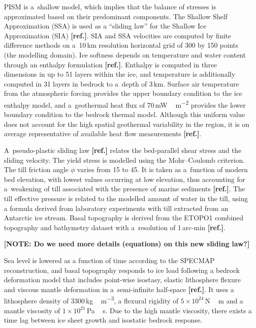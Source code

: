 \documentclass[tc, ms]{copernicus}
\newcommand{\note}[1]{\textbf{[NOTE: #1]}}
\newcommand{\aref}[0]{\textbf{[ref.]}}
\renewcommand{\citep}[1]{\aref}
\begin{document}
PISM is a~shallow model, which implies that the balance of stresses is
approximated based on their predominant components.
The Shallow Shelf Approximation (SSA) is used as a ``sliding law'' for the
Shallow Ice Approximation (SIA) \citep{bueler-brown-2009,winkelmann-etal-2011}.
SIA and SSA velocities are computed by finite difference methods on a~10\,km
resolution horizontal grid of 300 by 150 points (the modelling domain). Ice
softness depends on temperature and water content through an enthalpy
formulation \citep{aschwanden-blatter-2009,aschwanden-etal-2012}. Enthalpy is
computed in three dimensions in up to 51 layers within the
ice, and temperature is additionally computed in 31 layers in bedrock to
a~depth of 3\,km. Surface air temperature from the atmospheric forcing
provides the upper boundary condition to the ice enthalpy model, and
a~geothermal heat flux of 70\,\unit{mW\,m^{-2}} provides the lower boundary
condition to the bedrock thermal model. Although this uniform value does not
account for the high spatial geothermal variability in the region, it is on
average representative of available heat flow measurements
\citep{artemieva-mooney-2001,blackwell-richards-2004}.

A~pseudo-plastic sliding law \citep{aschwanden-etal-2013} relates the
bed-parallel shear stress and the sliding velocity. The yield stress is
modelled using the Mohr--Coulomb criterion. The till friction angle $\phi$
varies from 15 to 45{\degree}. It is taken as a~function of modern bed
elevation, with lowest values occurring at low elevation, thus accounting
for a~weakening of till associated with the presence of marine sediments
\citep{martin-etal-2011,aschwanden-etal-2013}. The till effective pressure is
related to the modelled amount of water in the till, using a formula derived
from laboratory experiments with till extracted from an Antarctic ice stream.
Basal topography is derived from the ETOPO1 combined topography
and bathymetry dataset with a~resolution of 1\,arc-min \citep{data:etopo1}.

\note{Do we need more details (equations) on this new sliding law?}

Sea level is lowered as a function of time according to the SPECMAP
reconstruction, and basal topography responds to ice load
following a bedrock deformation model that includes point-wise isostasy,
elastic lithosphere flexure and viscous mantle deformation in a~semi-infinite
half-space \citep{lingle-clark-1985,bueler-etal-2007}. It uses a lithosphere
density of 3300\,\unit{kg\,m^{-3}}, a flexural rigidity of $5 \times
10^{24}$\,\unit{N\,m} and a mantle viscosity of $1 \times
10^{21}$\,\unit{Pa\,s}. Due to the high mantle viscosity, there exists a time
lag between ice sheet growth and isostatic bedrock response.
\end{document}
